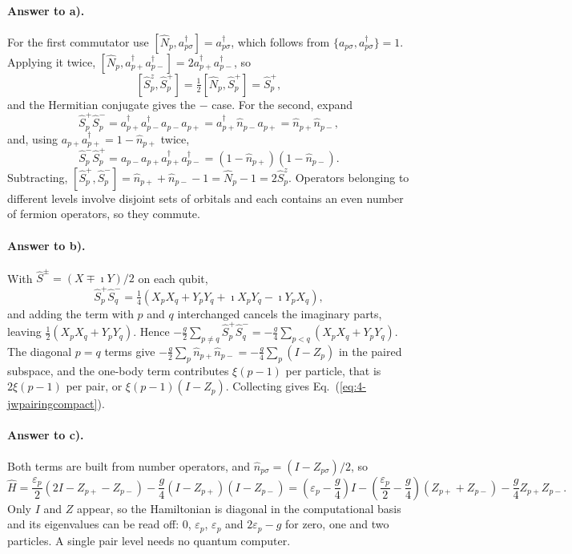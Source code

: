 \paragraph{Answer to a).}
For the first commutator use $[\hat{N}_p,a^{\dagger}_{p\sigma}]
=a^{\dagger}_{p\sigma}$, which follows from
$\{a_{p\sigma},a^{\dagger}_{p\sigma}\}=1$.  Applying it twice,
$[\hat{N}_p,a^{\dagger}_{p+}a^{\dagger}_{p-}]=2a^{\dagger}_{p+}
a^{\dagger}_{p-}$, so
\[
  \left[\hat{S}^{z}_p,\hat{S}^{+}_p\right]
   = \tfrac12\left[\hat{N}_p,\hat{S}^{+}_p\right]
   = \hat{S}^{+}_p ,
\]
and the Hermitian conjugate gives the $-$ case.  For the second, expand
\[
  \hat{S}^{+}_p\hat{S}^{-}_p
   = a^{\dagger}_{p+}a^{\dagger}_{p-}a_{p-}a_{p+}
   = a^{\dagger}_{p+}\hat{n}_{p-}a_{p+}
   = \hat{n}_{p+}\hat{n}_{p-},
\]
and, using $a_{p+}a^{\dagger}_{p+}=1-\hat{n}_{p+}$ twice,
\[
  \hat{S}^{-}_p\hat{S}^{+}_p
   = a_{p-}a_{p+}a^{\dagger}_{p+}a^{\dagger}_{p-}
   = \left(1-\hat{n}_{p+}\right)\left(1-\hat{n}_{p-}\right).
\]
Subtracting,
$[\hat{S}^{+}_p,\hat{S}^{-}_p]=\hat{n}_{p+}+\hat{n}_{p-}-1
=\hat{N}_p-1=2\hat{S}^{z}_p$.  Operators belonging to different levels
involve disjoint sets of orbitals and each contains an even number of fermion
operators, so they commute.

\paragraph{Answer to b).}
With $\hat{S}^{\pm}=(X\mp\imath Y)/2$ on each qubit,
\[
  \hat{S}^{+}_p\hat{S}^{-}_q
   = \tfrac14\left(X_pX_q+Y_pY_q
     +\imath X_pY_q-\imath Y_pX_q\right),
\]
and adding the term with $p$ and $q$ interchanged cancels the imaginary
parts, leaving $\tfrac12(X_pX_q+Y_pY_q)$.  Hence
$-\tfrac{g}{2}\sum_{p\ne q}\hat{S}^{+}_p\hat{S}^{-}_q
=-\tfrac{g}{4}\sum_{p<q}(X_pX_q+Y_pY_q)$.  The diagonal $p=q$ terms give
$-\tfrac{g}{2}\sum_p\hat{n}_{p+}\hat{n}_{p-}
=-\tfrac{g}{4}\sum_p(I-Z_p)$ in the paired subspace, and the one-body term
contributes $\xi(p-1)$ per particle, that is $2\xi(p-1)$ per pair, or
$\xi(p-1)(I-Z_p)$.  Collecting gives
Eq.~(\ref{eq:4-jwpairingcompact}).

\paragraph{Answer to c).}
Both terms are built from number operators, and
$\hat{n}_{p\sigma}=(I-Z_{p\sigma})/2$, so
\[
  \hat{H}
   = \frac{\varepsilon_p}{2}\left(2I-Z_{p+}-Z_{p-}\right)
     - \frac{g}{4}\left(I-Z_{p+}\right)\left(I-Z_{p-}\right)
   = \left(\varepsilon_p-\frac{g}{4}\right)I
     - \left(\frac{\varepsilon_p}{2}-\frac{g}{4}\right)
       \left(Z_{p+}+Z_{p-}\right)
     - \frac{g}{4}Z_{p+}Z_{p-} .
\]
Only $I$ and $Z$ appear, so the Hamiltonian is diagonal in the computational
basis and its eigenvalues can be read off: $0$, $\varepsilon_p$,
$\varepsilon_p$ and $2\varepsilon_p-g$ for zero, one and two particles.  A
single pair level needs no quantum computer.

